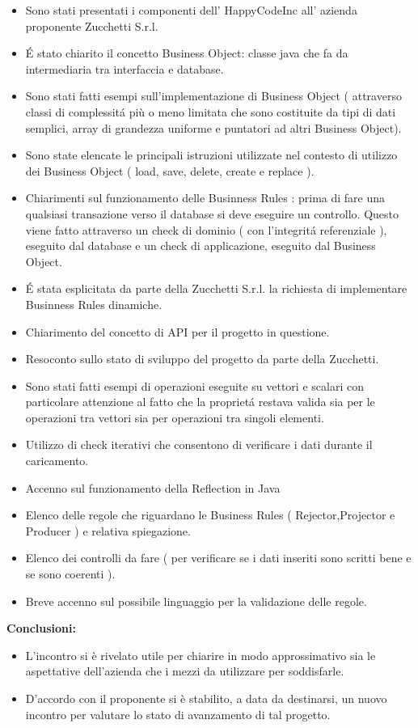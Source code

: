 \documentclass[11pt,titlepage,a4paper]{report}
\begin{document}
\begin{itemize}

\item Sono stati presentati i componenti dell' HappyCodeInc all' azienda proponente Zucchetti S.r.l.  
\item \'E stato chiarito il concetto Business Object: classe java che fa da intermediaria tra interfaccia e database.
\item Sono stati fatti esempi sull'implementazione di Business Object ( attraverso classi di complessit\'a pi\`u o meno limitata che sono costituite da tipi di dati semplici, array di grandezza uniforme e puntatori ad altri Business Object). 
\item Sono state elencate le principali istruzioni utilizzate nel contesto di utilizzo dei Business Object ( load, save, delete, create e replace ).
\item Chiarimenti sul funzionamento delle Businness Rules : prima di fare una qualsiasi transazione verso il database si deve eseguire un controllo. Questo viene fatto attraverso un check di dominio ( con l'integrit\'a referenziale ), eseguito dal database e un check di applicazione, eseguito dal Business Object.
\item \'E stata esplicitata da parte della Zucchetti S.r.l. la richiesta di implementare Businness Rules dinamiche.
\item  Chiarimento del concetto di API per il progetto in questione.
\item Resoconto sullo stato di sviluppo del progetto da parte della Zucchetti.
\item Sono stati fatti esempi di operazioni eseguite su vettori e scalari con particolare attenzione al fatto che la propriet\'a restava valida sia per le operazioni tra vettori sia per operazioni tra singoli elementi.
\item Utilizzo di check iterativi che consentono di verificare i dati durante il caricamento. 
\item Accenno sul funzionamento della Reflection in Java
\item Elenco delle regole che riguardano le Business Rules ( Rejector,Projector e Producer ) e relativa spiegazione.
\item Elenco dei controlli da fare ( per verificare se i dati inseriti sono scritti bene e se sono coerenti ).
\item Breve accenno sul possibile linguaggio per la validazione delle regole.

\end{itemize}
 
\textbf{Conclusioni:}
\begin{itemize}

\item   L'incontro si \`e rivelato utile per chiarire in modo approssimativo sia le aspettative dell'azienda che i mezzi da utilizzare per soddisfarle.
\item   D'accordo con il proponente si \`e stabilito, a data da destinarsi, un nuovo incontro per valutare lo stato di avanzamento di tal progetto.
\end{itemize}
\end{document}
